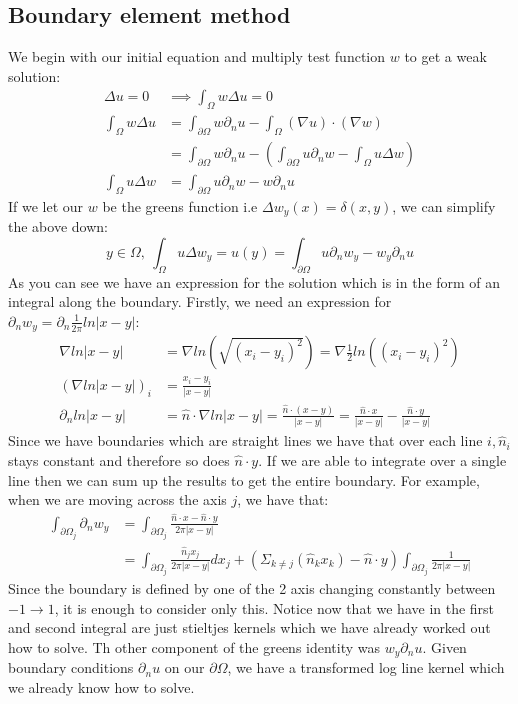 \documentclass{article}
\begin{document}
\subsection{Boundary element method}
We begin with our initial equation and multiply test function $w$ to get a weak solution:
\begin{align}
    \Delta u=0&\implies \int_\Omega w\Delta u=0\\
    \int_\Omega w\Delta u&=\int_{\partial\Omega}w\partial_nu-\int_\Omega(\nabla u)\cdot(\nabla w)\\
    &=\int_{\partial\Omega}w\partial_nu-(\int_{\partial\Omega}u\partial_nw-\int_\Omega u\Delta w)\\
    \int_\Omega u\Delta w&=\int_{\partial\Omega}u\partial_nw-w\partial_nu
\end{align}
If we let our $w$ be the greens function i.e $\Delta w_y(x) = \delta(x,y)$, we can simplify the above down:
$$y\in\Omega,\:\int_\Omega u\Delta w_y=u(y)=\int_{\partial\Omega}u\partial_nw_y-w_y\partial_nu$$
As you can see we have an expression for the solution which is in the form of an integral along the boundary.
Firstly, we need an expression for $\partial_nw_y = \partial_n\frac{1}{2\pi}ln|x-y|$:
\begin{align}
    \nabla ln|x-y|&=\nabla ln(\sqrt{(x_i-y_i)^2})=\nabla\frac{1}{2}ln((x_i-y_i)^2)\\
    (\nabla ln|x-y|)_i &=\frac{x_i-y_i}{|x-y|}\\
    \partial_n ln|x-y| &= \hat n\cdot\nabla ln|x-y| = \frac{\hat n\cdot(x-y)}{|x-y|} = \frac{\hat n\cdot x}{|x-y|}-\frac{\hat n\cdot y}{|x-y|}
\end{align}
Since we have boundaries which are straight lines we have that over each line $i,\hat n_i$ stays constant and therefore so does $\hat n\cdot y$.
If we are able to integrate over a single line then we can sum up the results to get the entire boundary.
For example, when we are moving across the axis $j$, we have that:
\begin{align}
    \int_{\partial\Omega_j}\partial_nw_y&=\int_{\partial\Omega_j}\frac{\hat n\cdot x-\hat n\cdot y}{2\pi|x-y|}\\
    &=\int_{\partial\Omega_j}\frac{\hat n_jx_j}{2\pi|x-y|}dx_j+(\Sigma_{k\neq j}(\hat n_kx_k)-\hat n\cdot y)\int_{\partial\Omega_j}\frac{1}{2\pi|x-y|}
\end{align}
Since the boundary is defined by one of the 2 axis changing constantly between $-1\rightarrow 1$, it is enough to consider only this.
Notice now that we have in the first and second integral are just stieltjes kernels which we have already worked out how to solve.
Th other component of the greens identity was $w_y\partial_nu$.
Given boundary conditions $\partial_nu$ on our $\partial\Omega$, we have a transformed log line kernel which we already know how to solve.
\end{document}
